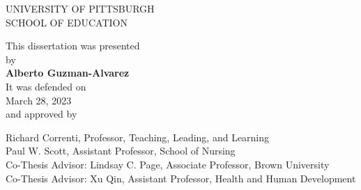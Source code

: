 
\setcounter{page}{2}

\pagestyle{plain}

\begin{center}
UNIVERSITY OF PITTSBURGH\\
SCHOOL OF EDUCATION
\end{center}

       \vspace*{8\baselineskip}


\begin{center}
This dissertation was presented\\
by\\
       \vspace*{1\baselineskip}
\textbf{Alberto Guzman-Alvarez}\\
       \vspace*{1\baselineskip}
It was defended on\\
March 28, 2023\\
and approved by
\end{center}

\begin{center}
Richard Correnti, Professor, Teaching, Leading, and Learning\\
Paul W. Scott, Assistant Professor, School of Nursing\\
Co-Thesis Advisor: Lindsay C. Page, Associate Professor, Brown University\\
Co-Thesis Advisor: Xu Qin, Assistant Professor, Health and Human Development\\
\end{center}

\newpage
